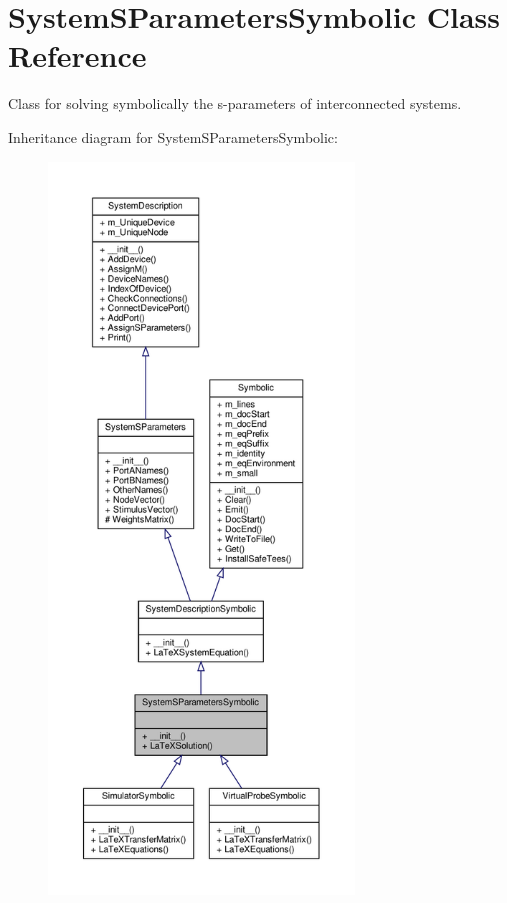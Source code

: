 \hypertarget{classSignalIntegrity_1_1SystemDescriptions_1_1SystemSParametersSymbolic_1_1SystemSParametersSymbolic}{}\section{System\+S\+Parameters\+Symbolic Class Reference}
\label{classSignalIntegrity_1_1SystemDescriptions_1_1SystemSParametersSymbolic_1_1SystemSParametersSymbolic}


Class for solving symbolically the s-\/parameters of interconnected systems.  




Inheritance diagram for System\+S\+Parameters\+Symbolic\+:
\nopagebreak
\begin{figure}[H]
\begin{center}
\leavevmode
\includegraphics[height=550pt]{classSignalIntegrity_1_1SystemDescriptions_1_1SystemSParametersSymbolic_1_1SystemSParametersSymbolic__inherit__graph}
\end{center}
\end{figure}


